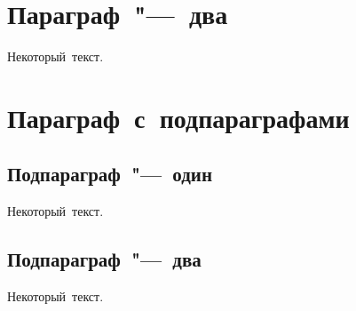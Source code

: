  \section{Параграф "--- два}\label{sec:ch3/sect2} 
  
 Некоторый текст. 
  
 \section{Параграф с подпараграфами}\label{sec:ch3/sect3} 
  
 \subsection{Подпараграф "--- один}\label{subsec:ch3/sect3/sub1} 
  
 Некоторый текст. 
  
 \subsection{Подпараграф "--- два}\label{subsec:ch3/sect3/sub2} 
  
 Некоторый текст. 
  
 \clearpage